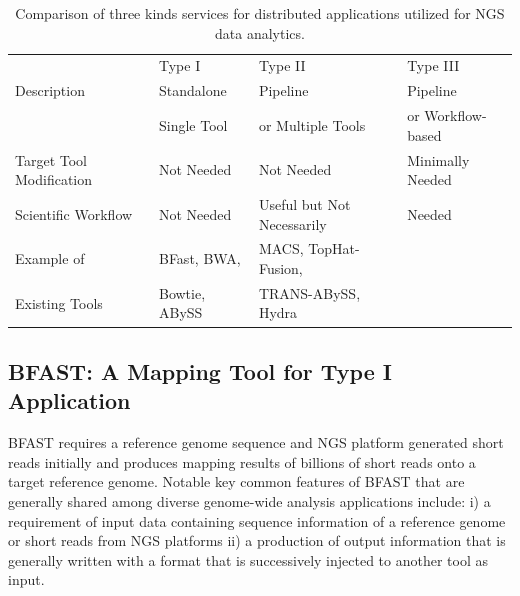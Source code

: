 \documentclass{cpeauth}
\begin{document}
\begin{table}[!h]
\begin{center}
 \caption{Comparison of three kinds services for distributed applications utilized for NGS data analytics. %
 }
\begin{tabular}{| l | l | l | l |} \hline \rowcolor[rgb]{0.8,0.8,0.8} &
Type I & Type II & Type III \\ Description & Standalone  & Pipeline & Pipeline \\ 
& Single Tool  & or Multiple Tools &  or Workflow-based \\\hline 
Target Tool Modification & Not Needed &
Not Needed & Minimally Needed \\ \hline Scientific Workflow & Not Needed & Useful but Not Necessarily &
Needed \\ \hline 
Example of & BFast, BWA,  & MACS, TopHat-Fusion,  &   
 \\
Existing Tools &  Bowtie, ABySS  & TRANS-ABySS, Hydra & \\
\hline
\end{tabular}
\label{table:three-type-service}
\end{center}
\end{table}


\subsection{BFAST: A Mapping Tool for Type I Application}


BFAST requires a reference genome sequence and NGS
platform generated short reads initially and produces mapping results
of billions of short reads onto a target reference genome.  Notable
key common features of BFAST that are generally shared among diverse genome-wide analysis applications include: i) a requirement of input data containing
sequence information of a reference genome or short reads from NGS
platforms ii) a production of output information that is generally
written with a format that is successively injected to another tool as
input.
\end{document}
